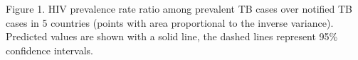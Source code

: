 Figure 1. HIV prevalence rate ratio among prevalent TB cases over notified TB cases in 5 countries (points with area proportional to the inverse variance). Predicted values are shown with a solid line, the dashed lines represent 95\% confidence intervals.